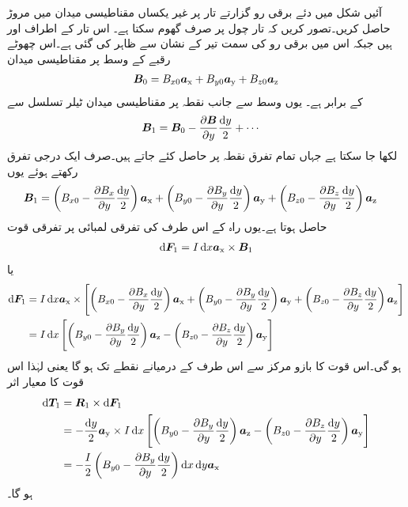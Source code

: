 آئیں شکل  میں دئے  برقی رو گزارتے تار پر غیر یکساں مقناطیسی میدان  میں مروڑ حاصل کریں۔تصور کریں کہ تار چول  پر صرف گھوم سکتا ہے۔ اس تار کے اطراف  اور  ہیں جبکہ اس میں برقی رو  کی سمت تیر کے نشان سے ظاہر کی گئی ہے۔اس چھوٹے رقبے کے وسط  پر مقناطیسی میدان
\begin{align}
{\ensuremath{{\boldsymbol{B}}}}_0=B_{x0}{\boldsymbol{a}}_{\textup{x}}+B_{y0}{\boldsymbol{a}}_{\textup{y}}+B_{z0}{\boldsymbol{a}}_{\textup{z}}
\end{align}
کے برابر ہے۔ یوں وسط سے  جانب نقطہ  پر مقناطیسی میدان ٹیلر تسلسل سے
\begin{align*}
\kvec{B}_1&=\kvec{B}_0 -\frac{\partial \kvec{B}}{\partial y}\frac{\dif y}{2}+\cdots
\end{align*}
لکھا جا سکتا ہے جہاں تمام تفرق نقطہ  پر حاصل کئے جاتے ہیں۔صرف ایک درجی تفرق رکھتے ہوئے یوں
\begin{align*}
\kvec{B}_1&=\left(B_{x0}-\frac{\partial B_{x}}{\partial y} \frac{\dif y}{2}\right)\ax+\left(B_{y0}-\frac{\partial B_{y}}{\partial y} \frac{\dif y}{2}\right)\ay+\left(B_{z0}-\frac{\partial B_{z}}{\partial y} \frac{\dif y}{2}\right)\az
\end{align*}
حاصل ہوتا ہے۔یوں راہ کے اس طرف کی  تفرقی لمبائی پر تفرقی قوت
\begin{align*}
\dif \kvec{F}_1=I \dif x \ax \times \kvec{B}_1
\end{align*}
یا
\begin{align*}
\dif \kvec{F}_1&=I \dif x \ax \times \left[\left(B_{x0}-\frac{\partial B_{x}}{\partial y} \frac{\dif y}{2}\right)\ax+\left(B_{y0}-\frac{\partial B_{y}}{\partial y} \frac{\dif y}{2}\right)\ay+\left(B_{z0}-\frac{\partial B_{z}}{\partial y} \frac{\dif y}{2}\right)\az \right]\\
&=I \dif x \left[\left(B_{y0}-\frac{\partial B_{y}}{\partial y} \frac{\dif y}{2}\right)\az-\left(B_{z0}-\frac{\partial B_{z}}{\partial y} \frac{\dif y}{2}\right)\ay \right]
\end{align*}
ہو گی۔اس قوت کا بازو مرکز سے اس طرف کے درمیانے نقطے تک ہو گا یعنی  لہٰذا اس قوت کا معیار اثر
\begin{align*}
\dif \kvec{T}_1&=\kvec{R}_1 \times \dif \kvec{F}_1\\
&=-\frac{\dif y}{2}\ay \times I \dif x \left[\left(B_{y0}-\frac{\partial B_{y}}{\partial y} \frac{\dif y}{2}\right)\az-\left(B_{z0}-\frac{\partial B_{z}}{\partial y} \frac{\dif y}{2}\right)\ay \right]\\
&=- \frac{I}{2}\left(B_{y0}-\frac{\partial B_{y}}{\partial y} \frac{\dif y}{2}\right)\dif x \dif y \ax
\end{align*}
ہو گا۔

